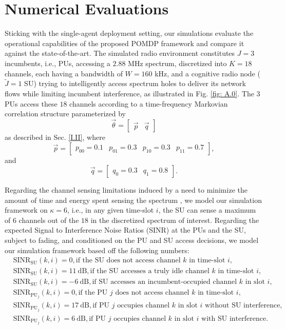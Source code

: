 \documentclass[12pt, draftcls, onecolumn]{IEEEtran}
\begin{document}
\section{Numerical Evaluations}\label{III}
Sticking with the single-agent deployment setting, our simulations evaluate the operational capabilities of the proposed POMDP framework and compare it against the state-of-the-art. The simulated radio environment constitutes $J{=}3$ incumbents, i.e., PUs, accessing a $2.88$ MHz spectrum, discretized into $K{=}18$ channels, each having a bandwidth of $W{=}160$ kHz, and a cognitive radio node ($\tilde{J}{=}1$ SU) trying to intelligently access spectrum holes to deliver its network flows while limiting incumbent interference, as illustrated in Fig. \ref{fig: A.0}. The $3$ PUs access these $18$ channels according to a time-frequency Markovian correlation structure parameterized by
\[\vec{\theta}=\begin{bmatrix}
                    \vec{p} & \vec{q}
               \end{bmatrix}\]
as described in Sec. \ref{I.II}, where
\[\vec{p}=\begin{bmatrix}
            p_{00}=0.1 & p_{01}=0.3 & p_{10}=0.3 & p_{11}=0.7
          \end{bmatrix},\]
and
\[\vec{q}=\begin{bmatrix}
            q_{0}=0.3 & q_{1}=0.8
          \end{bmatrix}.\]

Regarding the channel sensing limitations induced by a need to minimize the amount of time and energy spent sensing the spectrum \cite{WCL:3}, we model our simulation framework on $\kappa{=}6$, i.e., in any given time-slot $i$, the SU can sense a maximum of $6$ channels out of the $18$ in the discretized spectrum of interest. Regarding the expected Signal to Interference Noise Ratios (SINR) at the PUs and the SU, subject to fading, and conditioned on the PU and SU access decisions, we model our simulation framework based off the following numbers:
\begin{align*}
    &\text{SINR}_{\text{SU}}(k,i){=}0,\text{if the SU does not access channel $k$ in time-slot $i$,}\\
    &\text{SINR}_{\text{SU}}(k,i){=}11\ \text{dB},\text{if the SU accesses a truly idle channel $k$ in time-slot $i$,}\\
    &\text{SINR}_{\text{SU}}(k,i){=}{-}6\ \text{dB},\text{if SU accesses an incumbent-occupied channel $k$ in slot $i$,}\\
    &\text{SINR}_{\text{PU}_{j}}(k,i){=}0,\text{if the PU $j$ does not access channel $k$ in time-slot $i$,}\\
    &\text{SINR}_{\text{PU}_{j}}(k,i){=}17\ \text{dB},\text{if PU $j$ occupies channel $k$ in slot $i$ without SU interference,}\\
    &\text{SINR}_{\text{PU}_{j}}(k,i){=}6\ \text{dB},\text{if PU $j$ occupies channel $k$ in slot $i$ with SU interference.}
\end{align*}
\end{document}
